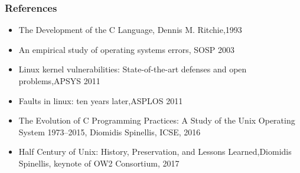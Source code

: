 \begin{frame}[plain]
	\frametitle{References}
	
	\begin{itemize}
		\item The Development of the C Language, Dennis M. Ritchie,1993
		\item  An empirical study of operating systems errors, SOSP 2003
		\item Linux kernel vulnerabilities: State-of-the-art defenses and open problems,APSYS 2011
		\item  Faults in linux: ten years later,ASPLOS 2011
		\item The Evolution of C Programming Practices:
		A Study of the Unix Operating System 1973–2015, Diomidis Spinellis,
		ICSE, 2016
		
		\item Half Century of Unix:
		History, Preservation, and
		Lessons Learned,Diomidis Spinellis, keynote of OW2 Consortium, 2017
		
	\end{itemize}
	
	
\end{frame}
